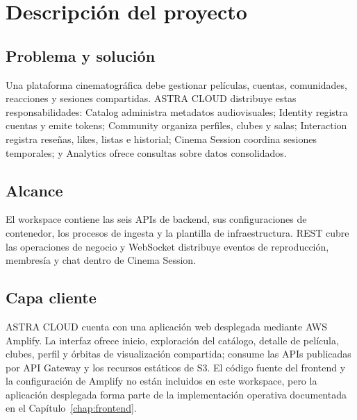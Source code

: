 \chapter{Descripción del proyecto}
\section{Problema y solución}
Una plataforma cinematográfica debe gestionar películas, cuentas, comunidades, reacciones y sesiones compartidas. ASTRA CLOUD distribuye estas responsabilidades: Catalog administra metadatos audiovisuales; Identity registra cuentas y emite tokens; Community organiza perfiles, clubes y salas; Interaction registra reseñas, likes, listas e historial; Cinema Session coordina sesiones temporales; y Analytics ofrece consultas sobre datos consolidados.
\section{Alcance}
El workspace contiene las seis APIs de backend, sus configuraciones de contenedor, los procesos de ingesta y la plantilla de infraestructura. REST cubre las operaciones de negocio y WebSocket distribuye eventos de reproducción, membresía y chat dentro de Cinema Session.
\section{Capa cliente}
ASTRA CLOUD cuenta con una aplicación web desplegada mediante AWS Amplify. La interfaz ofrece inicio, exploración del catálogo, detalle de película, clubes, perfil y órbitas de visualización compartida; consume las APIs publicadas por API Gateway y los recursos estáticos de S3. El código fuente del frontend y la configuración de Amplify no están incluidos en este workspace, pero la aplicación desplegada forma parte de la implementación operativa documentada en el Capítulo~\ref{chap:frontend}.
